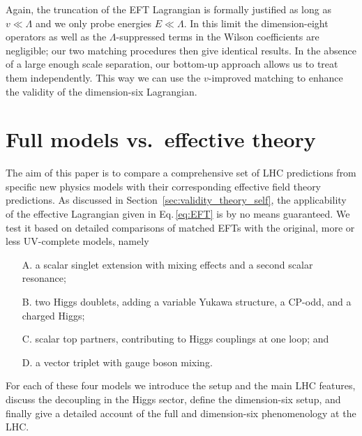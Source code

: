 Again, the truncation of the EFT Lagrangian is formally justified as
long as $v \ll \Lambda$ and we only probe energies $E \ll \Lambda$.
In this limit the dimension-eight operators as well as the
$\Lambda$-suppressed terms in the Wilson coefficients are negligible;
our two matching procedures then give identical results. In the
absence of a large enough scale separation, our bottom-up approach
allows us to treat them independently. This way we can use the
$v$-improved matching to enhance the validity of the dimension-six
Lagrangian.
%




\section{Full models vs.\ effective theory}
\label{sec:validity_full_vs_effective}

The aim of this paper is to compare a comprehensive set of LHC
predictions from specific new physics models with their corresponding
effective field theory predictions.  As discussed in
Section~\ref{sec:validity_theory_self}, the applicability of the effective
Lagrangian given in Eq.\,\eqref{eq:EFT} is by no means guaranteed. We
test it based on detailed comparisons of matched EFTs with the
original, more or less UV-complete models, namely
%
\begin{itemize}
\item[A.] a scalar singlet extension with mixing effects and a second
scalar resonance;
\item[B.] two Higgs doublets, adding a variable Yukawa structure, a
CP-odd, and a charged Higgs;
\item[C.] scalar top partners, contributing to Higgs couplings at one
loop; and
\item[D.] a vector triplet with gauge boson mixing.
\end{itemize}
%
For each of these four models we introduce the setup and the main LHC
features, discuss the decoupling in the Higgs sector, define the
dimension-six setup, and finally give a detailed account of the full and
dimension-six phenomenology at the LHC.

